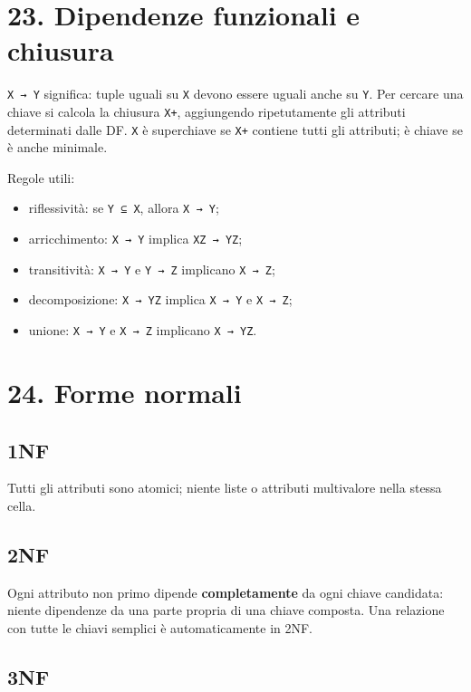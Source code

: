 \documentclass[
  10pt,
  a4paper,
]{article}
\providecommand{\tightlist}{%
  \setlength{\itemsep}{0pt}\setlength{\parskip}{0pt}}
\begin{document}
\section{23. Dipendenze funzionali e
chiusura}\label{23-dipendenze-funzionali-e-chiusura}

\texttt{X\ →\ Y} significa: tuple uguali su \texttt{X} devono essere
uguali anche su \texttt{Y}. Per cercare una chiave si calcola la
chiusura \texttt{X+}, aggiungendo ripetutamente gli attributi
determinati dalle DF. \texttt{X} è superchiave se \texttt{X+} contiene
tutti gli attributi; è chiave se è anche minimale.

Regole utili:

\begin{itemize}
\tightlist
\item
  riflessività: se \texttt{Y\ ⊆\ X}, allora \texttt{X\ →\ Y};
\item
  arricchimento: \texttt{X\ →\ Y} implica \texttt{XZ\ →\ YZ};
\item
  transitività: \texttt{X\ →\ Y} e \texttt{Y\ →\ Z} implicano
  \texttt{X\ →\ Z};
\item
  decomposizione: \texttt{X\ →\ YZ} implica \texttt{X\ →\ Y} e
  \texttt{X\ →\ Z};
\item
  unione: \texttt{X\ →\ Y} e \texttt{X\ →\ Z} implicano
  \texttt{X\ →\ YZ}.
\end{itemize}

\section{24. Forme normali}\label{24-forme-normali}

\subsection{1NF}\label{1nf}

Tutti gli attributi sono atomici; niente liste o attributi multivalore
nella stessa cella.

\subsection{2NF}\label{2nf}

Ogni attributo non primo dipende \textbf{completamente} da ogni chiave
candidata: niente dipendenze da una parte propria di una chiave
composta. Una relazione con tutte le chiavi semplici è automaticamente
in 2NF.

\subsection{3NF}\label{3nf}
\end{document}

